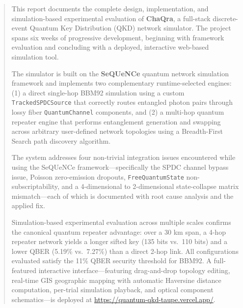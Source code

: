 \documentclass[12pt,oneside,letterpaper,english]{article}
\begin{document}
\begin{abstract}
\noindent
This report documents the complete design, implementation, and simulation-based experimental evaluation of \textbf{ChaQra}, a full-stack discrete-event Quantum Key Distribution (QKD) network simulator. The project spans six weeks of progressive development, beginning with framework evaluation and concluding with a deployed, interactive web-based simulation tool.

The simulator is built on the \textbf{SeQUeNCe} quantum network simulation framework and implements two complementary runtime-selected engines: (1) a direct single-hop BBM92 simulation using a custom \texttt{TrackedSPDCSource} that correctly routes entangled photon pairs through lossy fiber \texttt{QuantumChannel} components, and (2) a multi-hop quantum repeater engine that performs entanglement generation and swapping across arbitrary user-defined network topologies using a Breadth-First Search path discovery algorithm.

The system addresses four non-trivial integration issues encountered while using the SeQUeNCe framework—specifically the SPDC channel bypass issue, Poisson zero-emission dropouts, \texttt{FreeQuantumState} non-subscriptability, and a 4-dimensional to 2-dimensional state-collapse matrix mismatch—each of which is documented with root cause analysis and the applied fix.

Simulation-based experimental evaluation across multiple scales confirms the canonical quantum repeater advantage: over a 30 km span, a 4-hop repeater network yields a longer sifted key (135 bits vs.\ 110 bits) and a lower QBER (5.19\% vs.\ 7.27\%) than a direct 2-hop link. All configurations evaluated satisfy the 11\% QBER security threshold for BBM92. A full-featured interactive interface—featuring drag-and-drop topology editing, real-time GIS geographic mapping with automatic Haversine distance computation, per-trial simulation playback, and optical component schematics—is deployed at \url{https://quantum-qkd-taupe.vercel.app/}.
\end{abstract}
\newpage

\renewcommand{\baselinestretch}{1}\normalsize
\tableofcontents
\renewcommand{\baselinestretch}{1}\normalsize
\thispagestyle{fancy}
\newpage

\doublespacing
\thispagestyle{fancy}
\end{document}
